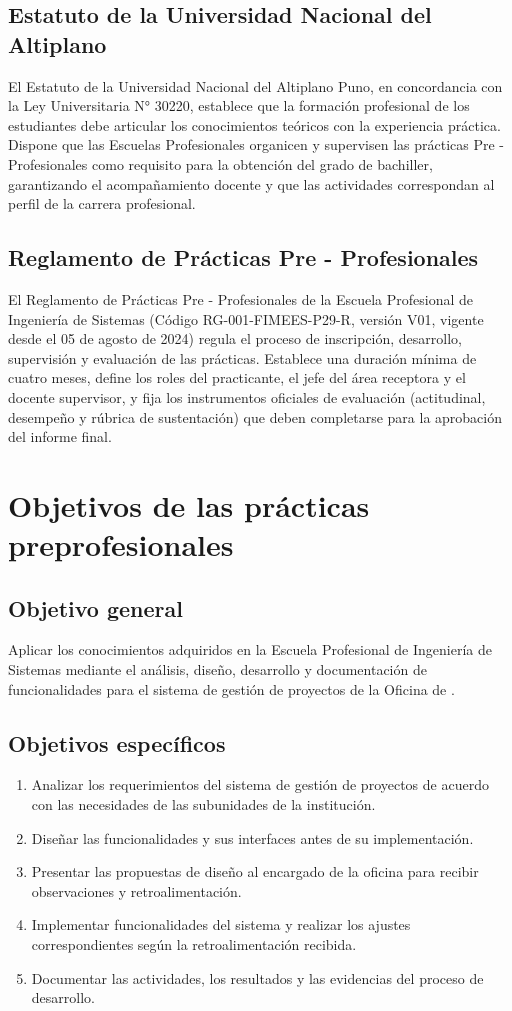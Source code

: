 \subsection{Estatuto de la Universidad Nacional del Altiplano}
El Estatuto de la Universidad Nacional del Altiplano Puno, en concordancia con la Ley Universitaria N° 30220, establece que la formación profesional de los estudiantes debe articular los conocimientos teóricos con la experiencia práctica. Dispone que las Escuelas Profesionales organicen y supervisen las prácticas Pre - Profesionales como requisito para la obtención del grado de bachiller, garantizando el acompañamiento docente y que las actividades correspondan al perfil de la carrera profesional.

\subsection{Reglamento de Prácticas Pre - Profesionales}
El Reglamento de Prácticas Pre - Profesionales de la Escuela Profesional de Ingeniería de Sistemas (Código RG-001-FIMEES-P29-R, versión V01, vigente desde el 05 de agosto de 2024) regula el proceso de inscripción, desarrollo, supervisión y evaluación de las prácticas. Establece una duración mínima de cuatro meses, define los roles del practicante, el jefe del área receptora y el docente supervisor, y fija los instrumentos oficiales de evaluación (actitudinal, desempeño y rúbrica de sustentación) que deben completarse para la aprobación del informe final.

\section{Objetivos de las prácticas preprofesionales}
\subsection{Objetivo general}
Aplicar los conocimientos adquiridos en la Escuela Profesional de Ingeniería de Sistemas mediante el análisis, diseño, desarrollo y documentación de funcionalidades para el sistema de gestión de proyectos de la Oficina de \InstitucionNombre.

\subsection{Objetivos específicos}
\begin{enumerate}
    \item Analizar los requerimientos del sistema de gestión de proyectos de acuerdo con las necesidades de las subunidades de la institución.
    \item Diseñar las funcionalidades y sus interfaces antes de su implementación.
    \item Presentar las propuestas de diseño al encargado de la oficina para recibir observaciones y retroalimentación.
    \item Implementar funcionalidades del sistema y realizar los ajustes correspondientes según la retroalimentación recibida.
    \item Documentar las actividades, los resultados y las evidencias del proceso de desarrollo.
\end{enumerate}

